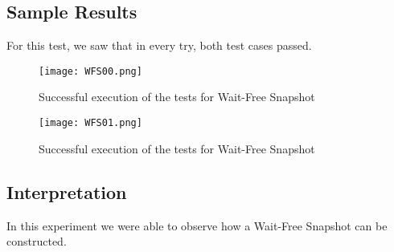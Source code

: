 \subsection{Sample Results}
\par
For this test, we saw that in every try, both test cases passed.
\par
\begin{figure}[h]
  \centering
  \texttt{[image: WFS00.png]}
  \caption{Successful execution of the tests for Wait-Free Snapshot}
  \label{fig:WFS00}
\end{figure}
\par
\begin{figure}[h]
  \centering
  \texttt{[image: WFS01.png]}
  \caption{Successful execution of the tests for Wait-Free Snapshot}
  \label{fig:WFS01}
\end{figure}
\par
\subsection{Interpretation}
In this experiment we were able to observe how a Wait-Free Snapshot can be
constructed. 
